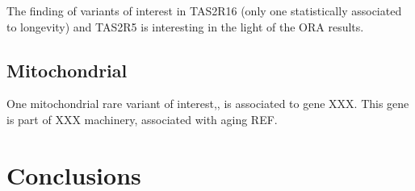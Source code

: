 \documentclass{article}\usepackage[]{graphicx}\usepackage[dvipsnames]{xcolor}
\begin{document}
The finding of variants of interest in TAS2R16 (only one statistically associated to longevity) and TAS2R5 is interesting in the light of the ORA results.



\subsection{Mitochondrial}

One mitochondrial rare variant of interest,, is associated to gene XXX. This gene is part of XXX machinery, associated with aging REF. 

\section{Conclusions}








\end{document}
